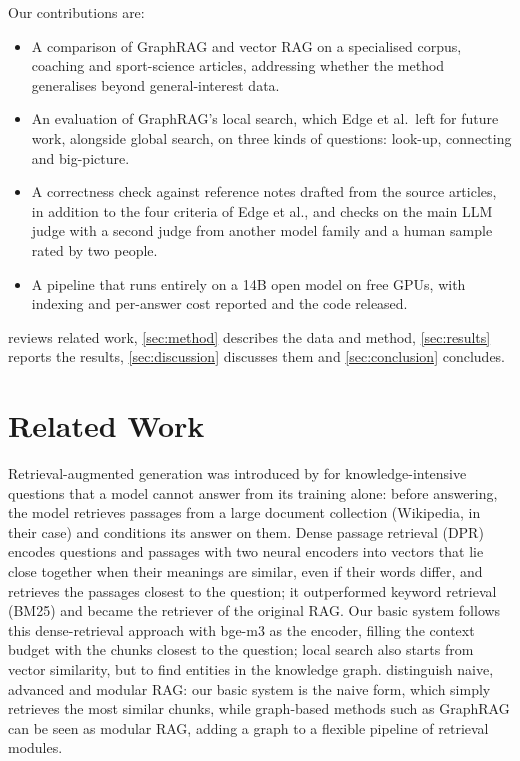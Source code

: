 \documentclass{article}
\begin{document}
Our contributions are:
\begin{itemize}[leftmargin=*,nosep]
  \item A comparison of GraphRAG and vector RAG on a specialised corpus, coaching and sport-science
    articles, addressing whether the method generalises beyond general-interest data.
  \item An evaluation of GraphRAG's local search, which Edge et al.\ left for future work, alongside
    global search, on three kinds of questions: look-up, connecting and big-picture.
  \item A correctness check against reference notes drafted from the source articles, in addition to the four
    criteria of Edge et al., and checks on the main LLM judge with a second judge from another model
    family and a human sample rated by two people.
  \item A pipeline that runs entirely on a 14B open model on free GPUs, with indexing and per-answer
    cost reported and the code released.
\end{itemize}
 reviews related work, \cref{sec:method} describes the data and method,
\cref{sec:results} reports the results, \cref{sec:discussion} discusses them and
\cref{sec:conclusion} concludes.

\section{Related Work}
\label{sec:related}

Retrieval-augmented generation was introduced by \citet{lewis2020rag} for knowledge-intensive questions
that a model cannot answer from its training alone: before answering, the model retrieves passages from
a large document collection (Wikipedia, in their case) and conditions its answer on them.
Dense passage retrieval (DPR) \cite{karpukhin2020dpr} encodes questions and passages with two neural
encoders into vectors that lie close together when their meanings are similar, even if their words
differ, and retrieves the passages closest to the question; it outperformed keyword retrieval (BM25)
and became the retriever of the original RAG. Our basic system follows this dense-retrieval approach with bge-m3
\cite{chen2024bgem3} as the encoder, filling the context budget with the chunks closest to the
question; local search also starts from vector similarity, but to find entities in the knowledge graph.
\citet{gao2023ragsurvey} distinguish naive, advanced and modular RAG: our basic system is the
naive form, which simply retrieves the most similar chunks, while graph-based methods such as GraphRAG can be seen as
modular RAG, adding a graph to a flexible pipeline of retrieval modules.
\end{document}
